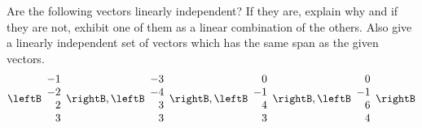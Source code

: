 \begin{enumialphparenastyle}
\begin{ex} Are the following vectors linearly independent? If they are, explain
why and if they are not, exhibit one of them as a linear combination of the
others. Also give a linearly independent set of vectors which has the same
span as the given vectors. 
\begin{equation*}
\leftB 
\begin{array}{r}
-1 \\ 
-2 \\ 
2 \\ 
3
\end{array}
\rightB ,\leftB 
\begin{array}{r}
-3 \\ 
-4 \\ 
3 \\ 
3
\end{array}
\rightB ,\leftB 
\begin{array}{r}
0 \\ 
-1 \\ 
4 \\ 
3
\end{array}
\rightB ,\leftB 
\begin{array}{r}
0 \\ 
-1 \\ 
6 \\ 
4
\end{array}
\rightB
\end{equation*}
\end{ex}


\end{enumialphparenastyle}
